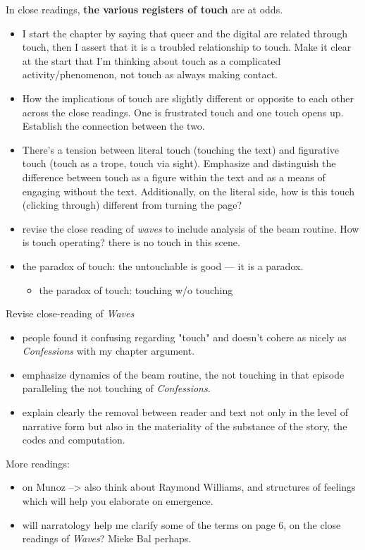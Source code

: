 \documentclass[11pt]{article}
\begin{document}
\begin{enumerate}
In close readings, \textbf{\textbf{the various registers of touch}} are at odds.  
\begin{itemize}
\item I start the chapter by saying that queer and the digital are related
through touch, then I assert that it is a troubled relationship to
touch. Make it clear at the start that I'm thinking about touch as a
complicated activity/phenomenon, not touch as always making
contact.
\item How the implications of touch are slightly different or opposite to
each other across the close readings. One is frustrated touch and
one touch opens up. Establish the connection between the two.
\item There's a tension between literal touch (touching the text) and
figurative touch (touch as a trope, touch via sight). Emphasize and
distinguish the difference between touch as a figure within the text
and as a means of engaging without the text. Additionally, on the
literal side, how is this touch (clicking through) different from
turning the page?
\item revise the close reading of \emph{waves} to include analysis of the beam
routine. How is touch operating? there is no touch in this scene.
\item the paradox of touch: the untouchable is good --- it is a paradox. 
\begin{itemize}
\item the paradox of touch: touching w/o touching
\end{itemize}
\end{itemize}

Revise close-reading of \emph{Waves}
\begin{itemize}
\item people found it confusing regarding "touch" and doesn't cohere as
nicely as \emph{Confessions} with my chapter argument.
\item emphasize dynamics of the beam routine, the not touching in that
episode paralleling the not touching of \emph{Confessions}.
\item explain clearly the removal between reader and text not only in the
level of narrative form but also in the materiality of the substance
of the story, the codes and computation.
\end{itemize}

More readings:
\begin{itemize}
\item on Munoz --> also think about Raymond Williams, and structures of
feelings which will help you elaborate on emergence.
\item will narratology help me clarify some of the terms on page 6, on the
close readings of \emph{Waves}? Mieke Bal perhaps.
\end{itemize}


\end{enumerate}
\end{document}
